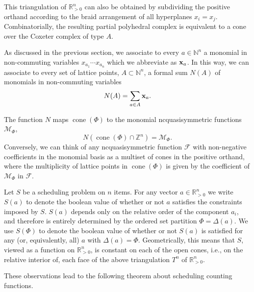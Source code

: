 \documentclass[12pt,reqno]{amsart}
\numberwithin{definition}{section}
\theoremstyle{definition}
\newcommand{\RR}{\mathbb{R}}
\newcommand{\NN}{\mathbb{N}}
\newcommand{\ZZ}{\mathbb{Z}}
\newcommand{\SSS}{\mathcal{S}}
\newcommand{\cone}{\operatorname{cone}}
\newcommand{\ncM}{\mathcal{M}}
\newcommand{\poly}{\chi} %
\newcommand{\comment}[1]{\textsf{\footnotesize #1}}
\begin{document}
This triangulation of $\RR_{> 0}^n$ can also be obtained by subdividing the positive orthand according to the braid arrangement of all hyperplanes $x_i=x_j$. Combinatorially, the resulting partial polyhedral complex is equivalent to a cone over the Coxeter complex of type $A$. 

As discussed in the previous section, we associate to every $a\in\NN^n$ a monomial in non-commuting variables $x_{a_1}\cdots x_{a_n}$ which we abbreviate as ${\bf x}_a$. In this way, we can associate to every set of lattice points, $A\subset\NN^n$, a formal sum $N(A)$ of monomials in non-commuting variables
\[
  N(A) = \sum_{a\in A} {\bf x}_a.
\]

The function $N$ maps $\cone(\Phi)$ to the monomial ncquasisymmetric functions $\ncM_\Phi$,
\[
  N(\cone(\Phi)\cap\ZZ^n) = \ncM_\Phi.
\]
Conversely, we can think of any ncquasisymmetric function $\mathcal{F}$ with non-negative coefficients in the monomial basis as a multiset of cones in the positive orthand, where the multiplicity of lattice points in $\cone(\Phi)$ is given by the coefficient of $\ncM_\Phi$ in $\mathcal{F}$.






Let $S$ be a scheduling problem on $n$ items. For any vector $a\in\RR^n_{> 0}$ we write $S(a)$ to denote the boolean value of whether or not $a$ satisfies the constraints imposed by $S$.  $S(a)$ depends only on the relative order of the component $a_i$, and therefore is entirely determined by the ordered set partition $\Phi=\Delta(a)$. We use $S(\Phi)$ to denote the boolean value of whether or not $S(a)$ is satisfied for any (or, equivalently, all) $a$ with $\Delta(a)=\Phi$. Geometrically, this means that $S$, viewed as a function on $\RR^n_{>0}$, is constant on each of the open cones, i.e., on the relative interior of, each face of the above triangulation $T^n$ of $\RR^n_{> 0}$.

These observations lead to the following theorem about scheduling counting functions. 

\end{document}
